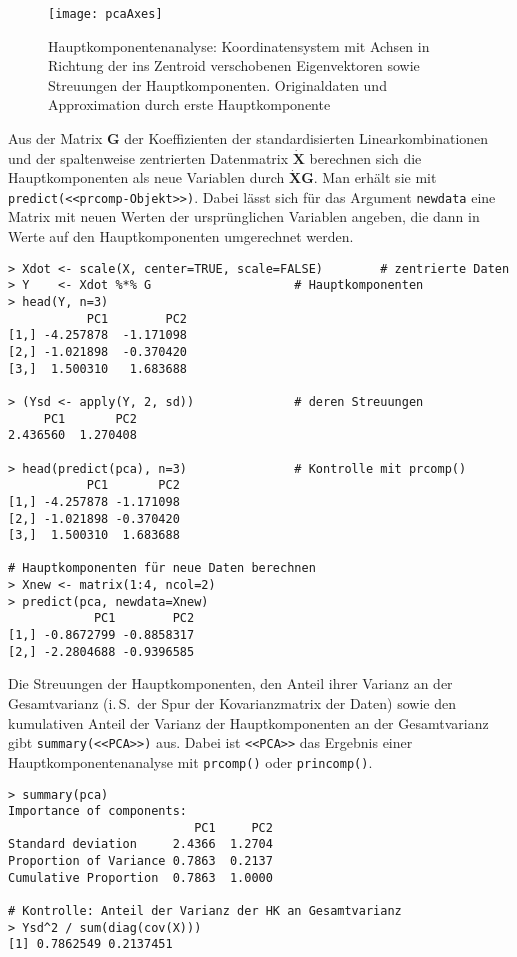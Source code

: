 \begin{figure}[ht]
\centering
\texttt{[image: pcaAxes]}
\vspace*{-1em}
\caption{Hauptkomponentenanalyse: Koordinatensystem mit Achsen in Richtung der ins Zentroid verschobenen Eigenvektoren sowie Streuungen der Hauptkomponenten. Originaldaten und Approximation durch erste Hauptkomponente}
\label{fig:pca}
\end{figure}

Aus der Matrix $\bm{G}$ der Koeffizienten der standardisierten Linearkombinationen und der spaltenweise zentrierten Datenmatrix $\dot{\bm{X}}$ berechnen sich die Hauptkomponenten als neue Variablen durch $\dot{\bm{X}} \bm{G}$. Man erhält sie mit \lstinline!predict(<<prcomp-Objekt>>)!. Dabei lässt sich für das Argument \lstinline!newdata! eine Matrix mit neuen Werten der ursprünglichen Variablen angeben, die dann in Werte auf den Hauptkomponenten umgerechnet werden.
\begin{lstlisting}
> Xdot <- scale(X, center=TRUE, scale=FALSE)        # zentrierte Daten
> Y    <- Xdot %*% G                    # Hauptkomponenten
> head(Y, n=3)
           PC1        PC2
[1,] -4.257878  -1.171098
[2,] -1.021898  -0.370420
[3,]  1.500310   1.683688

> (Ysd <- apply(Y, 2, sd))              # deren Streuungen
     PC1       PC2
2.436560  1.270408

> head(predict(pca), n=3)               # Kontrolle mit prcomp()
           PC1       PC2
[1,] -4.257878 -1.171098
[2,] -1.021898 -0.370420
[3,]  1.500310  1.683688

# Hauptkomponenten für neue Daten berechnen
> Xnew <- matrix(1:4, ncol=2)
> predict(pca, newdata=Xnew)
            PC1        PC2
[1,] -0.8672799 -0.8858317
[2,] -2.2804688 -0.9396585
\end{lstlisting}

Die Streuungen der Hauptkomponenten, den Anteil ihrer Varianz an der Gesamtvarianz (i.\,S.\ der Spur der Kovarianzmatrix der Daten) sowie den kumulativen Anteil der Varianz der Hauptkomponenten an der Gesamtvarianz gibt \lstinline!summary(<<PCA>>)! aus. Dabei ist \lstinline!<<PCA>>! das Ergebnis einer Hauptkomponentenanalyse mit \lstinline!prcomp()! oder \lstinline!princomp()!.
\begin{lstlisting}
> summary(pca)
Importance of components:
                          PC1     PC2
Standard deviation     2.4366  1.2704
Proportion of Variance 0.7863  0.2137
Cumulative Proportion  0.7863  1.0000

# Kontrolle: Anteil der Varianz der HK an Gesamtvarianz
> Ysd^2 / sum(diag(cov(X)))
[1] 0.7862549 0.2137451
\end{lstlisting}


